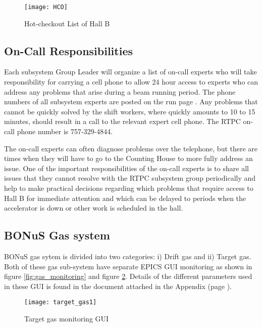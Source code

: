 \begin{figure}[H]
	\centering
	\texttt{[image: HCO]}
	\caption{Hot-checkout List of Hall B}
	\label{fig:hco}
\end{figure}


\subsection{On-Call Responsibilities}
\label{sub-sec:onCallRespose}

Each subsystem Group Leader will organize a list of on-call experts who will take responsibility for carrying a cell phone to allow 24 hour access to experts who can address any problems that arise during a beam running period. The phone numbers of all subsystem experts are posted on the run page \cite{runpage}. Any problems that cannot be quickly solved by the shift workers, where quickly amounts to 10 to 15 minutes, should result in a call to the relevant expert cell phone. The RTPC on-call phone number is {\color{red}757-329-4844}.

The on-call experts can often diagnose problems over the telephone, but there are times when they will have to go to the Counting House to more fully address an issue. One of the important responsibilities of the on-call experts is to share all issues that they cannot resolve with the RTPC subsystem group periodically and help to make practical decisions regarding which problems that require access to Hall B for immediate attention and which can be delayed to periods when the accelerator is down or other work is scheduled in the hall.

\subsection{BONuS Gas system}
\label{sub-sec:gas_control}

BONuS gas sytem is divided into two categories: i) Drift gas and ii) Target gas. Both of these gas sub-system have separate EPICS GUI monitoring as shown in figure \ref{fig:gas_monitoring} and figure \ref{fig:target_gas}. Details of the different parameters used in these GUI is found in the document attached in the Appendix (page \pageref{appedix}).

\begin{figure}[H]
	\centering
	\texttt{[image: target\_gas1]}
	\caption{Target gas monitoring GUI}
	\label{fig:target_gas}
\end{figure}

